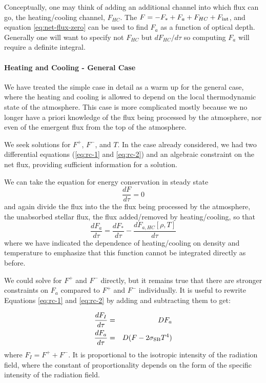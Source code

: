 \documentclass{emulateapj}
\newcommand{\fsum}{F_I}
\newcommand{\sigmasb}{\sigma_{\rm SB}}
\begin{document}
Conceptually, one may think of adding an additional channel into which
flux can go, the heating/cooling channel, $F_{HC}$.  The $F=-F_* + F_a
+ F_{HC} + F_{\rm int}$, and equation \ref{eq:net-flux-zero} can be used to find $F_a$ as a
function of optical depth.  Generally one will want to specify not
$F_{HC}$ but $dF_{HC}/d\tau$ so computing $F_a$ will require a
definite integral.

\paragraph{Heating and Cooling - General Case}

We have treated the simple case in detail as a warm up for the
general case, where the heating and cooling is allowed to depend on
the local thermodynamic state of the atmosphere.  This case is more
complicated mostly because we no longer have a priori knowledge of the
flux being processed by the atmosphere, nor even of the emergent flux
from the top of the atmosphere.

We seek solutions for $F^+$, $F^-$, and $T$.  In the case already
considered, we had two differential equations (\ref{eq:rc-1} and
\ref{eq:rc-2}) and an algebraic constraint on the net flux, providing
sufficient information for a solution.

We can take the equation for energy conservation in steady state
\begin{equation}
  \frac{dF}{d\tau} = 0
\end{equation}
and again divide the flux into the the flux being processed by the
atmosphere, the unabsorbed stellar flux, the flux added/removed by
heating/cooling, so that
\begin{equation}
  \frac{dF_a}{d\tau} = \frac{dF_*}{d\tau} 
  - \frac{dF_{a,HC}[\rho, T]}{d\tau}
  \label{eq:general-hc-net-flux-unmodified}
\end{equation}
where we have indicated the dependence of heating/cooling on density
and temperature to emphasize that this function cannot be integrated
directly as before.

We could solve for $F^+$ and $F^-$ directly, but it remains true that
there are stronger constraints on $F_a$ compared to $F^+$ and $F^-$
individually.  It is useful to rewrite Equations \ref{eq:rc-1} and
\ref{eq:rc-2} by adding and subtracting them to get:

\begin{eqnarray}
\frac{d\fsum}{d\tau} &=& D F_a 
\label{eq:general-hc-total-flux-unmodified} \\
\frac{dF_a}{d\tau} &=& D(F - 2\sigmasb T^4)
\label{eq:general-hc-temp-gradient-unmodified}
\end{eqnarray}
where $\fsum = F^+ + F^-$.  It is proportional to the isotropic
intensity of the radiation field, where the constant of
proportionality depends on the form of the specific intensity of the
radiation field.
\end{document}
